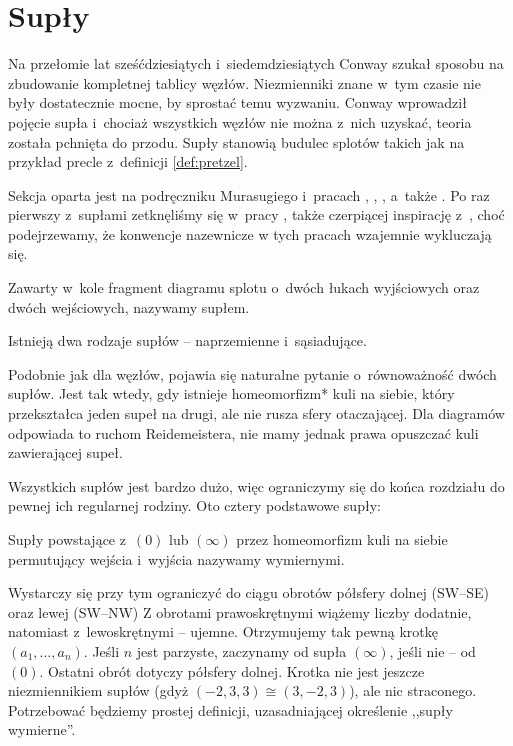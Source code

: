 \section{Supły} %
\label{sec:tangle}

Na przełomie lat sześćdziesiątych i~siedemdziesiątych Conway szukał sposobu na zbudowanie kompletnej tablicy węzłów.
Niezmienniki znane w~tym czasie nie były dostatecznie mocne, by sprostać temu wyzwaniu.
Conway wprowadził pojęcie supła i~chociaż wszystkich węzłów nie można z~nich uzyskać, teoria została pchnięta do przodu.
Supły stanowią budulec splotów takich jak na przykład precle z~definicji \ref{def:pretzel}.

Sekcja oparta jest na podręczniku Murasugiego \cite{murasugi96} i~pracach \cite{conway70}, \cite{kauffman97}, \cite{kauffman04}, a~także \cite{schubert56}.
Po raz pierwszy z~supłami zetknęliśmy się w~pracy \cite{janiak04}, także czerpiącej inspirację z~\cite{murasugi96}, choć podejrzewamy, że konwencje nazewnicze w tych pracach wzajemnie wykluczają się.

\begin{definition}[supeł]
    \label{def:tangle}
    Zawarty w~kole fragment diagramu splotu o~dwóch łukach wyjściowych oraz dwóch wejściowych, nazywamy supłem.
\end{definition}

Istnieją dwa rodzaje supłów -- naprzemienne i~sąsiadujące.


Podobnie jak dla węzłów, pojawia się naturalne pytanie o~równoważność dwóch supłów.
Jest tak wtedy, gdy istnieje homeomorfizm* kuli na siebie, który przekształca jeden supeł na drugi, ale nie rusza sfery otaczającej.
Dla diagramów odpowiada to ruchom Reidemeistera, nie mamy jednak prawa opuszczać kuli zawierającej supeł.

Wszystkich supłów jest bardzo dużo, więc ograniczymy się do końca rozdziału do pewnej ich regularnej rodziny.
Oto cztery podstawowe supły:


\begin{definition}
    \label{def:rational_tangle}
    Supły powstające z~$(0)$ lub $(\infty)$ przez homeomorfizm kuli na siebie permutujący wejścia i~wyjścia nazywamy wymiernymi.
\end{definition}


Wystarczy się przy tym ograniczyć do ciągu obrotów półsfery dolnej (SW--SE) oraz lewej (SW--NW)
Z obrotami prawoskrętnymi wiążemy liczby dodatnie, natomiast z~lewoskrętnymi -- ujemne.
Otrzymujemy tak pewną krotkę $(a_1, \ldots, a_n)$.
Jeśli $n$ jest parzyste, zaczynamy od supła $(\infty)$, jeśli nie -- od $(0)$.
Ostatni obrót dotyczy półsfery dolnej.
Krotka nie jest jeszcze niezmiennikiem supłów (gdyż $(-2,3,3) \cong (3, -2, 3)$), ale nic straconego.
Potrzebować będziemy prostej definicji, uzasadniającej określenie ,,supły wymierne''.

